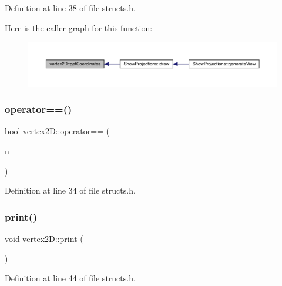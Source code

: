Definition at line 38 of file structs.\+h.

Here is the caller graph for this function\+:
\nopagebreak
\begin{figure}[H]
\begin{center}
\leavevmode
\includegraphics[width=350pt]{structvertex2_d_abf1f2b45c9ea667e4b32618596e7f2b1_icgraph}
\end{center}
\end{figure}
\mbox{\label{structvertex2_d_a3ae69a0028a3d45d339daacd7918e67a}} 
\subsubsection{\texorpdfstring{operator==()}{operator==()}}
{\footnotesize\ttfamily bool vertex2\+D\+::operator== (\begin{DoxyParamCaption}\item[{const \mbox{\hyperlink{structvertex2_d}{vertex2D}} \&}]{n }\end{DoxyParamCaption})\hspace{0.3cm}{\ttfamily [inline]}}



Definition at line 34 of file structs.\+h.

\mbox{\label{structvertex2_d_a32655e7a17f960cf0b997a7537b06d26}} 
\subsubsection{\texorpdfstring{print()}{print()}}
{\footnotesize\ttfamily void vertex2\+D\+::print (\begin{DoxyParamCaption}{ }\end{DoxyParamCaption})\hspace{0.3cm}{\ttfamily [inline]}}



Definition at line 44 of file structs.\+h.



